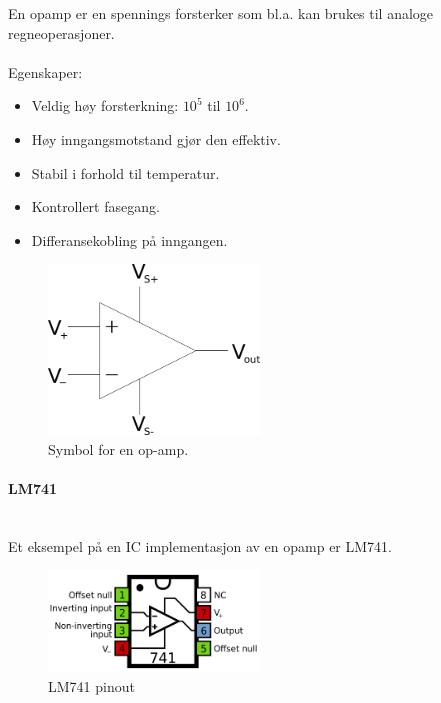 En opamp er en spennings forsterker som bl.a. kan brukes til analoge
regneoperasjoner.
\\\\
Egenskaper:
\begin{itemize}
\item Veldig høy forsterkning: $10^5$ til $10^6$.
\item Høy inngangsmotstand gjør den effektiv.
\item Stabil i forhold til temperatur.
\item Kontrollert fasegang.
\item Differansekobling på inngangen.
\end{itemize}

\begin{figure}[H]
  \caption{Symbol for en op-amp.}
  \centering
  \includegraphics[width=0.5\textwidth]{./img/opamp-symbol}
\end{figure}



\paragraph{LM741} \mbox{} \\
Et eksempel på en IC implementasjon av en opamp er LM741.
\begin{figure}[H]
  \caption{LM741 pinout}
  \centering
  \includegraphics[width=0.5\textwidth]{./img/lm741}
\end{figure}
